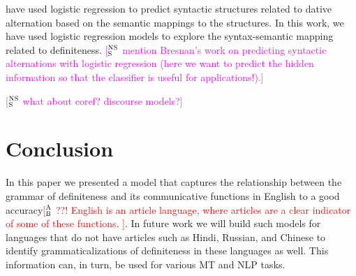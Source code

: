 \documentclass[11pt,letterpaper]{article}
\newcommand{\ensuretext}[1]{#1}
\newcommand{\nssmarker}{\ensuretext{\textcolor{magenta}{\ensuremath{^{\textsc{NS}}_{\textsc{S}}}}}}
\newcommand{\abmarker}{\ensuretext{\textcolor{red}{\ensuremath{^{\textsc{A}}_{\textsc{B}}}}}}
\newcommand{\arkcomment}[3]{\ensuretext{\textcolor{#3}{[#1 #2]}}}
\newcommand{\nss}[1]{\arkcomment{\nssmarker}{#1}{magenta}}
\newcommand{\ab}[1]{\arkcomment{\abmarker}{#1}{red}}
\begin{document}
\citet{bresnan07} have used logistic regression to predict syntactic structures related to dative alternation based on the semantic mappings to the structures. In this work, we have used logistic regression models to explore the syntax-semantic mapping related to definiteness. 
\nss{mention Bresnan's work on predicting syntactic alternations with logistic regression 
(here we want to predict the hidden information 
so that the classifier is useful for applications!).}



\nss{what about coref? discourse models?} 


\section{Conclusion}\label{sec:conclusion}

In this paper we presented a model that captures the relationship between the grammar of definiteness and its communicative functions in English to a good accuracy\ab{??! English is an article language, where articles are a clear indicator of some of these functions. }. In future work we will build such models for languages that do not have articles such as Hindi, Russian, and Chinese to identify grammaticalizations of definiteness in these languages as well. This information can, in turn, be used for various MT and NLP tasks.





\setlength{\bibsep}{10pt}
{\fontsize{10}{12.25}\selectfont
}
\end{document}
